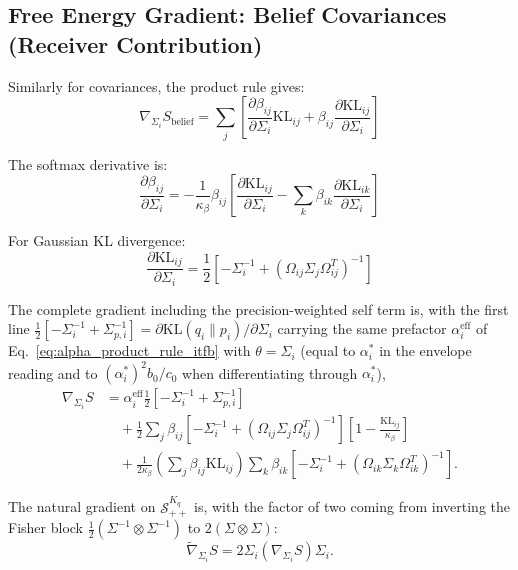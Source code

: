 \documentclass[11pt]{article}
\begin{document}
\subsection*{Free Energy Gradient: Belief Covariances (Receiver Contribution)}

Similarly for covariances, the product rule gives:
\begin{equation}
\nabla_{\Sigma_i} S_{\mathrm{belief}} = \sum_j \left[ \frac{\partial \beta_{ij}}{\partial \Sigma_i} \mathrm{KL}_{ij} + \beta_{ij} \frac{\partial \mathrm{KL}_{ij}}{\partial \Sigma_i} \right]
\end{equation}

The softmax derivative is:
\begin{equation}
\frac{\partial \beta_{ij}}{\partial \Sigma_i} = -\frac{1}{\kappa_\beta} \beta_{ij} \left[\frac{\partial \mathrm{KL}_{ij}}{\partial \Sigma_i} - \sum_k \beta_{ik} \frac{\partial \mathrm{KL}_{ik}}{\partial \Sigma_i}\right]
\end{equation}

For Gaussian KL divergence:
\begin{equation}
\frac{\partial \mathrm{KL}_{ij}}{\partial \Sigma_i} = \frac{1}{2}\left[-\Sigma_i^{-1} + (\Omega_{ij}\Sigma_j\Omega_{ij}^T)^{-1}\right]
\end{equation}

The complete gradient including the precision-weighted self term is, with the first line $\frac{1}{2}[-\Sigma_i^{-1} + \Sigma_{p,i}^{-1}] = \partial \mathrm{KL}(q_i \| p_i)/\partial \Sigma_i$ carrying the same prefactor $\alpha_i^{\mathrm{eff}}$ of Eq.~\eqref{eq:alpha_product_rule_itfb} with $\theta = \Sigma_i$ (equal to $\alpha_i^*$ in the envelope reading and to $(\alpha_i^*)^2 b_0/c_0$ when differentiating through $\alpha_i^*$),
\begin{align}
\nabla_{\Sigma_i} S &= \alpha_i^{\mathrm{eff}}\frac{1}{2}\left[-\Sigma_i^{-1} + \Sigma_{p,i}^{-1}\right] \nonumber \\
&\quad + \frac{1}{2}\sum_j \beta_{ij} \left[-\Sigma_i^{-1} + (\Omega_{ij}\Sigma_j\Omega_{ij}^T)^{-1}\right]\left[1 - \frac{\mathrm{KL}_{ij}}{\kappa_\beta}\right] \nonumber \\
&\quad + \frac{1}{2\kappa_\beta}\left(\sum_j \beta_{ij}\mathrm{KL}_{ij}\right) \sum_k \beta_{ik} \left[-\Sigma_i^{-1} + (\Omega_{ik}\Sigma_k\Omega_{ik}^T)^{-1}\right].
\end{align}

The natural gradient on $\mathcal{S}_{++}^{K_q}$ is, with the factor of two coming from inverting the Fisher block $\tfrac{1}{2}(\Sigma^{-1}\otimes\Sigma^{-1})$ to $2(\Sigma\otimes\Sigma)$:
\begin{equation}
\tilde{\nabla}_{\Sigma_i} S = 2\Sigma_i (\nabla_{\Sigma_i} S) \Sigma_i.
\end{equation}
\end{document}
